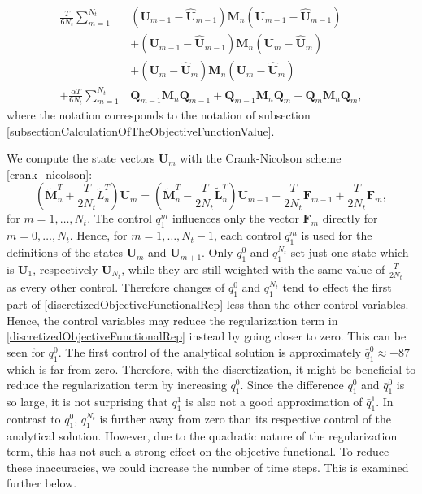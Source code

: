 \begin{equation}
\label{discretizedObjectiveFunctionalRep}
\begin{aligned}
\frac{T}{6N_t}\sum_{m=1}^{N_t}&\left(\mathbf{U}_{m-1}-\hat{\mathbf{U}}_{m-1}\right)\mathbf{M}_n\left(\mathbf{U}_{m-1}-\hat{\mathbf{U}}_{m-1}\right)\\
&+ \left(\mathbf{U}_{m-1}-\hat{\mathbf{U}}_{m-1}\right)\mathbf{M}_n\left(\mathbf{U}_{m}-\hat{\mathbf{U}}_{m}\right)\\
&+ \left(\mathbf{U}_{m}-\hat{\mathbf{U}}_{m}\right)\mathbf{M}_n\left(\mathbf{U}_{m}-\hat{\mathbf{U}}_{m}\right)\\
+ \frac{\alpha T}{6N_t}\sum_{m=1}^{N_t}&\mathbf{Q}_{m-1}\mathbf{M}_n\mathbf{Q}_{m-1} + \mathbf{Q}_{m-1}\mathbf{M}_n\mathbf{Q}_{m} + \mathbf{Q}_{m}\mathbf{M}_n\mathbf{Q}_{m},
\end{aligned}
\end{equation}
where the notation corresponds to the notation of subsection \ref{subsectionCalculationOfTheObjectiveFunctionValue}.

We compute the state vectors $\mathbf{U}_m$ with the Crank-Nicolson scheme \eqref{crank_nicolson}:
\begin{equation*}
\left(\tilde{\mathbf{M}}_n^T + \frac{T}{2N_t} \tilde{L}_n^T\right) \mathbf{U}_m = \left(\tilde{\mathbf{M}}_n^T - \frac{T}{2N_t} \tilde{\mathbf{L}}_n^T\right) \mathbf{U}_{m-1} + \frac{T}{2N_t} \mathbf{F}_{m-1} + \frac{T}{2N_t} \mathbf{F}_m,
\end{equation*}
for $m=1,\dotsc,N_t$. The control $q^m_1$ influences only the vector $\mathbf{F}_m$ directly for $m=0,\dotsc,N_t$. Hence, for $m=1,\dotsc,N_t-1$, each control $q^m_1$ is used for the definitions of the states $\mathbf{U}_m$ and $\mathbf{U}_{m+1}$. Only $q^0_1$ and $q^{N_t}_1$ set just one state which is $\mathbf{U}_1$, respectively $\mathbf{U}_{N_t}$, while they are still weighted with the same value of $\frac{T}{2N_t}$ as every other control. Therefore changes of $q^0_1$ and $q^{N_t}_1$ tend to effect the first part of \eqref{discretizedObjectiveFunctionalRep} less than the other control variables. Hence, the control variables may reduce the regularization term in \eqref{discretizedObjectiveFunctionalRep} instead by going closer to zero. This can be seen for $q^0_1$. The first control of the analytical solution is approximately $\bar{q}^0_1\approx-87$ which is far from zero. Therefore, with the discretization, it might be beneficial to reduce the regularization term by increasing $q^0_1$. Since the difference $q^0_1$ and $\bar{q}^0_1$ is so large, it is not surprising that $q^1_1$ is also not a good approximation of $\bar{q}^1_1$. In contrast to $q^0_1$, $q^{N_t}_1$ is further away from zero than its respective control of the analytical solution. However, due to the quadratic nature of the regularization term, this has not such a strong effect on the objective functional. To reduce these inaccuracies, we could increase the number of time steps. This is examined further below.\\

